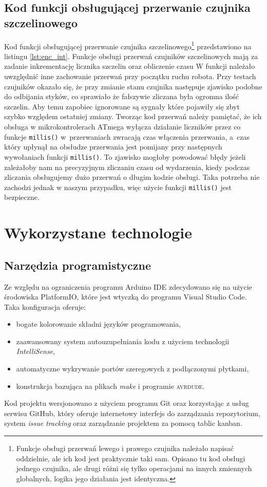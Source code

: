 \documentclass[11pt]{article}
\begin{document}
\subsection{Kod funkcji obsługującej przerwanie czujnika szczelinowego}
Kod funkcji obsługującej przerwanie czujnika szczelinowego\footnote{Funkcje obsługi przerwań lewego i prawego czujnika należało napisać oddzielnie, ale ich kod jest praktycznie taki sam.
Opisano tu kod obsługi jednego czujnika, ale drugi różni się tylko operacjami na innych zmiennych globalnych, logika jego działania jest identyczna.} przedstawiono na listingu \ref{lst:enc_int}.
Funkcje obsługi przerwań czujników szczelinowych mają za zadanie inkrementację licznika szczelin oraz obliczenie czasu
W funkcji należało uwzględnić inne zachowanie przerwań przy początku ruchu robota.
Przy testach czujników okazało się, że przy zmianie stanu czujnika następuje zjawisko podobne do odbijania styków, co sprawiało że fałszywie zliczana była ogromna ilość szczelin.
Aby temu zapobiec ignorowane są sygnały które pojawiły się zbyt szybko względem ostatniej zmiany.
Tworząc kod przerwań należy pamiętać, że ich obsługa w mikrokontrolerach ATmega wyłącza działanie liczników przez co funkcje \texttt{millis()} w~przerwaniach zwracają czas włączenia przerwania, a~czas który upłynął na obsłudze przerwania jest pomijany przy następnych wywołaniach funkcji \texttt{millis()}.
To zjawisko mogłoby powodować błędy jeżeli zależałoby nam na precyzyjnym zliczaniu czasu od wydarzenia, kiedy podczas zliczania obsługujemy dużo przerwań o długim kodzie obsługi.
Taka potrzeba nie zachodzi jednak w naszym przypadku, więc użycie funkcji \texttt{millis()} jest bezpieczne.



\section{Wykorzystane technologie}
\subsection{Narzędzia programistyczne}
Ze względu na ograniczenia programu Arduino IDE zdecydowano się na użycie środowiska PlatformIO, które jest wtyczką do programu Visual Studio Code. Taka konfiguracja oferuje:
\begin{itemize}
	\item bogate kolorowanie składni języków programowania,
	\item zaawansowany system autouzupełniania kodu z użyciem technologii \textit{IntelliSense},
	\item automatyczne wykrywanie portów szeregowych z podłączonymi płytkami,
	\item konstrukcja bazująca na plikach \textit{make} i programie \textsc{avrdude}.
\end{itemize}
Kod projektu wersjonowano z użyciem programu Git oraz korzystając z usług serwisu GitHub, który oferuje internetowy interfejs do zarządzania repozytorium, system \textit{issue tracking} oraz zarządzanie projektem za pomocą tablic kanban.
\end{document}
